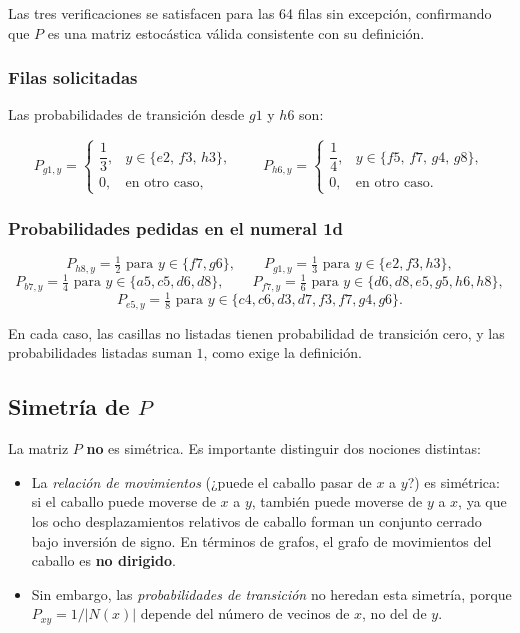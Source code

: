 \documentclass[12pt,a4paper]{article}
\begin{document}
Las tres verificaciones se satisfacen para las 64 filas sin excepción,
confirmando que \(P\) es una matriz estocástica válida consistente con
su definición.

\subsubsection*{Filas solicitadas}

Las probabilidades de transición desde \(g1\) y \(h6\) son:

\[
P_{g1,y}=
\begin{cases}
\dfrac13, & y\in\{e2,\,f3,\,h3\},\\
0,& \text{en otro caso},
\end{cases}
\qquad
P_{h6,y}=
\begin{cases}
\dfrac14, & y\in\{f5,\,f7,\,g4,\,g8\},\\
0,& \text{en otro caso}.
\end{cases}
\]

\subsubsection*{Probabilidades pedidas en el numeral 1d}

\[
P_{h8,y}=\tfrac12 \text{ para } y\in\{f7,g6\},
\qquad
P_{g1,y}=\tfrac13 \text{ para } y\in\{e2,f3,h3\},
\]
\[
P_{b7,y}=\tfrac14 \text{ para } y\in\{a5,c5,d6,d8\},
\qquad
P_{f7,y}=\tfrac16 \text{ para } y\in\{d6,d8,e5,g5,h6,h8\},
\]
\[
P_{e5,y}=\tfrac18 \text{ para } y\in\{c4,c6,d3,d7,f3,f7,g4,g6\}.
\]

En cada caso, las casillas no listadas tienen probabilidad de
transición cero, y las probabilidades listadas suman \(1\), como exige
la definición.

\subsection{Simetría de \(P\)}

La matriz \(P\) \textbf{no} es simétrica. Es importante distinguir dos
nociones distintas:

\begin{itemize}
    \item La \emph{relación de movimientos} (¿puede el caballo pasar de
    \(x\) a \(y\)?) es simétrica: si el caballo puede moverse de \(x\)
    a \(y\), también puede moverse de \(y\) a \(x\), ya que los ocho
    desplazamientos relativos de caballo forman un conjunto cerrado
    bajo inversión de signo. En términos de grafos, el grafo de
    movimientos del caballo es \textbf{no dirigido}.

    \item Sin embargo, las \emph{probabilidades de transición} no
    heredan esta simetría, porque \(P_{xy}=1/|N(x)|\) depende del
    número de vecinos de \(x\), no del de \(y\).
\end{itemize}
\end{document}
